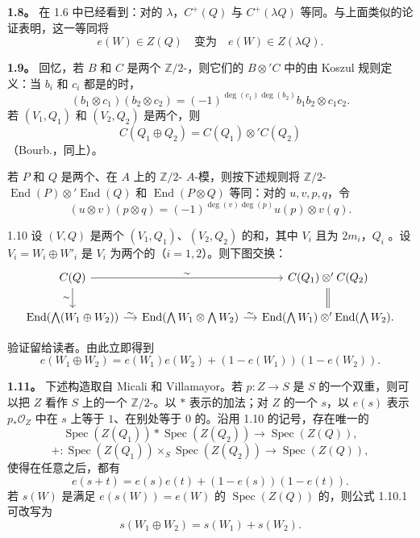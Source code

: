 \textbf{1.8。} 在 1.6 中已经看到：对的 $\lambda$，$C^+(Q)$ 与 $C^+(\lambda Q)$ 等同。与上面类似的论证表明，这一等同将
\[
e(W)\in Z(Q)\quad\text{变为}\quad e(W)\in Z(\lambda Q).
\]

\textbf{1.9。} 回忆，若 $B$ 和 $C$ 是两个 $\mathbb Z/2$-，则它们的 $B\otimes' C$ 中的由 Koszul 规则定义：当 $b_i$ 和 $c_i$ 都是的时，
\[
(b_1\otimes c_1)(b_2\otimes c_2)
=(-1)^{\deg(c_1)\deg(b_2)}b_1b_2\otimes c_1c_2.
\]
若 $(V_1,Q_1)$ 和 $(V_2,Q_2)$ 是两个，则
\[
C(Q_1\oplus Q_2)=C(Q_1)\otimes' C(Q_2)
\]
（Bourb.，同上）。

若 $P$ 和 $Q$ 是两个、在 $A$ 上的 $\mathbb Z/2$- $A$-模，则按下述规则将 $\mathbb Z/2$- $\operatorname{End}(P)\otimes'\operatorname{End}(Q)$ 和 $\operatorname{End}(P\otimes Q)$ 等同：对的 $u,v,p,q$，令
\[
(u\otimes v)(p\otimes q)=(-1)^{\deg(v)\deg(p)}u(p)\otimes v(q).
\]

\begin{SGAresult}{}{1.10}
设 $(V,Q)$ 是两个 $(V_1,Q_1)$、$(V_2,Q_2)$ 的和，其中 $V_i$ 且为 $2m_i$，$Q_i$ 。设 $V_i=W_i\oplus W'_i$ 是 $V_i$ 为两个的（$i=1,2$）。则下图交换：
\[
\begin{tikzcd}[column sep=small]
C(Q)\arrow[rr,"\sim"]\arrow[d,"\sim"']&&C(Q_1)\otimes'C(Q_2)\arrow[d,equal]\\
\operatorname{End}(\bigwedge(W_1\oplus W_2))\arrow[r,"\sim"]&
\operatorname{End}(\bigwedge W_1\otimes\bigwedge W_2)\arrow[r,"\sim"]&
\operatorname{End}(\bigwedge W_1)\otimes'\operatorname{End}(\bigwedge W_2).
\end{tikzcd}
\]
\end{SGAresult}
验证留给读者。由此立即得到
\[
e(W_1\oplus W_2)=e(W_1)e(W_2)+(1-e(W_1))(1-e(W_2)).\tag{1.10.1}
\]

\textbf{1.11。} 下述构造取自 Micali 和 Villamayor。若 $p:Z\to S$ 是 $S$ 的一个双重，则可以把 $Z$ 看作 $S$ 上的一个 $\mathbb Z/2$-。以 $*$ 表示的加法；对 $Z$ 的一个 $s$，以 $e(s)$ 表示 $p_*\mathscr O_Z$ 中在 $s$ 上等于 $1$、在别处等于 $0$ 的。沿用 1.10 的记号，存在唯一的
\[
\operatorname{Spec}(Z(Q_1))*\operatorname{Spec}(Z(Q_2))\longrightarrow\operatorname{Spec}(Z(Q)),\tag{1.11.1}
\]
\[
+:\operatorname{Spec}(Z(Q_1))\times_S\operatorname{Spec}(Z(Q_2))\longrightarrow\operatorname{Spec}(Z(Q)),
\]
使得在任意之后，都有
\[
e(s+t)=e(s)e(t)+(1-e(s))(1-e(t)).
\]
若 $s(W)$ 是满足 $e(s(W))=e(W)$ 的 $\operatorname{Spec}(Z(Q))$ 的，则公式 1.10.1 可改写为
\[
s(W_1\oplus W_2)=s(W_1)+s(W_2).
\]


